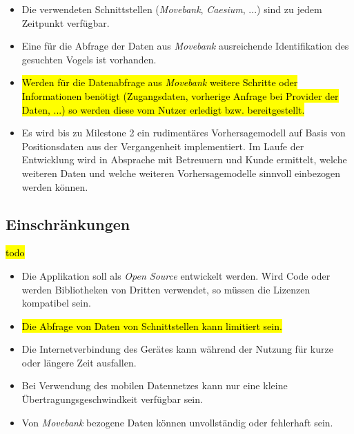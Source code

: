 \documentclass[12pt]{article} %
\begin{document}
\begin{itemize} 
 	 \item Die verwendeten Schnittstellen (\textit{Movebank}, \textit{Caesium}, ...) sind zu jedem Zeitpunkt verfügbar.
 	 \item Eine für die Abfrage der Daten aus \textit{Movebank} ausreichende Identifikation des gesuchten Vogels ist vorhanden. 
 	 \item \hl{Werden für die Datenabfrage aus \textit{Movebank} weitere Schritte oder Informationen benötigt (Zugangsdaten, vorherige Anfrage bei Provider der Daten, ...) so werden diese vom Nutzer erledigt bzw. bereitgestellt.}
 	 \item Es wird bis zu Milestone 2 ein rudimentäres Vorhersagemodell auf Basis von Positionsdaten aus der Vergangenheit implementiert. Im Laufe der Entwicklung wird in Absprache mit Betreuuern und Kunde ermittelt, welche weiteren Daten und welche weiteren Vorhersagemodelle sinnvoll einbezogen werden können.
\end{itemize} 


\subsection{Einschränkungen}

\hl{todo}

\begin{itemize} 
	\item Die Applikation soll als \textit{Open Source} entwickelt werden. Wird Code oder werden Bibliotheken von Dritten verwendet, so müssen die Lizenzen kompatibel sein.
	\item \hl{Die Abfrage von Daten von Schnittstellen kann limitiert sein.}
	\item Die Internetverbindung des Gerätes kann während der Nutzung für kurze oder längere Zeit ausfallen.
	\item Bei Verwendung des mobilen Datennetzes kann nur eine kleine Übertragungsgeschwindkeit verfügbar sein.
	\item Von \textit{Movebank} bezogene Daten können unvollständig oder fehlerhaft sein.
\end{itemize} 

\end{document}
